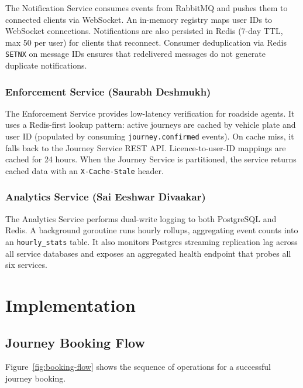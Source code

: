\documentclass[12pt,a4paper]{article}
\begin{document}
The Notification Service consumes events from RabbitMQ and pushes them to connected clients via WebSocket. An in-memory registry maps user IDs to WebSocket connections. Notifications are also persisted in Redis (7-day TTL, max 50 per user) for clients that reconnect. Consumer deduplication via Redis \texttt{SETNX} on message IDs ensures that redelivered messages do not generate duplicate notifications.

\subsubsection{Enforcement Service (Saurabh Deshmukh)}

The Enforcement Service provides low-latency verification for roadside agents. It uses a Redis-first lookup pattern: active journeys are cached by vehicle plate and user ID (populated by consuming \texttt{journey.confirmed} events). On cache miss, it falls back to the Journey Service REST API. Licence-to-user-ID mappings are cached for 24 hours. When the Journey Service is partitioned, the service returns cached data with an \texttt{X-Cache-Stale} header.

\subsubsection{Analytics Service (Sai Eeshwar Divaakar)}

The Analytics Service performs dual-write logging to both PostgreSQL and Redis. A background goroutine runs hourly rollups, aggregating event counts into an \texttt{hourly\_stats} table. It also monitors Postgres streaming replication lag across all service databases and exposes an aggregated health endpoint that probes all six services.

\section{Implementation}

\subsection{Journey Booking Flow}

Figure~\ref{fig:booking-flow} shows the sequence of operations for a successful journey booking.
\end{document}
